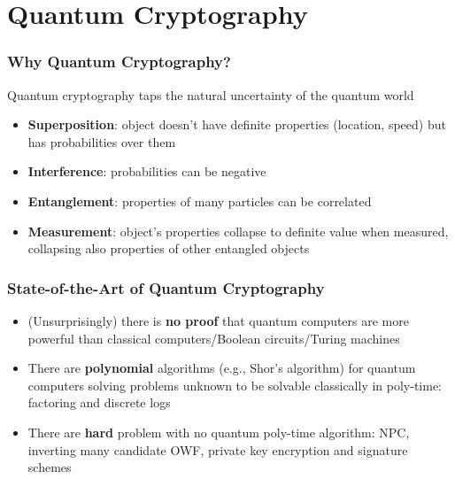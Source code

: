 \section{Quantum Cryptography}
\begin{frame}\frametitle{Why Quantum Cryptography?}
Quantum cryptography taps the natural uncertainty of the quantum world
\begin{itemize}
\item \textbf{Superposition}: object doesn't have definite properties (location, speed) but has probabilities over them
\item \textbf{Interference}: probabilities can be negative
\item \textbf{Entanglement}: properties of many particles can be correlated
\item \textbf{Measurement}: object's properties collapse to definite value when measured, collapsing also properties of other entangled objects
\end{itemize}
\end{frame}
\begin{frame}\frametitle{State-of-the-Art of Quantum Cryptography}
\begin{itemize}
\item (Unsurprisingly) there is \textbf{no proof} that quantum computers are more powerful than classical computers/Boolean circuits/Turing machines
\item There are \textbf{polynomial} algorithms (e.g., Shor's algorithm) for quantum computers solving problems unknown to be solvable classically in poly-time: factoring and discrete logs
\item There are \textbf{hard} problem with no quantum poly-time algorithm: NPC, inverting many candidate OWF, private key encryption and signature schemes
\end{itemize}
\end{frame}
